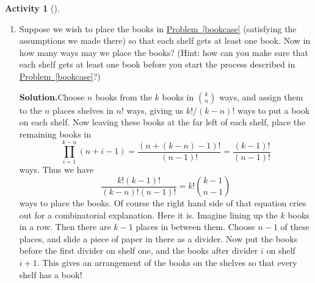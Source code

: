 \documentclass[10pt,]{book}
\theoremstyle{plain}
\theoremstyle{definition}
\newtheorem{activity}[project]{Activity}
\numberwithin{equation}{chapter}
\begin{document}
\begin{activity}[]
\begin{enumerate}[label=(\alph*)]
~\par
\item Suppose we wish to place the books in \hyperref[bookcase]{Problem~\ref{bookcase}} (satisfying the assumptions we made there) so that each shelf gets at least one book. Now in how many ways may we place the books? (Hint: how can you make sure that each shelf gets at least one book before you start the process described in \hyperref[bookcase]{Problem~\ref{bookcase}}?)%
\par\medskip\noindent%
\textbf{Solution.}\quad Choose \(n\) books from the \(k\) books in \(\binom{k}{n}\) ways, and assign them to the \(n\) places shelves in \(n!\) ways, giving us \(k!/(k-n)!\) ways to put a book on each shelf. Now leaving these books at the far left of each shelf, place the remaining books in%
\begin{equation*}
\prod_{i=1}^{k-n}
(n+i-1)=\frac{(n+(k-n)-1)!}{(n-1)!}=\frac{(k-1)!}{(n-1)!}
\end{equation*}
ways. Thus we have%
\begin{equation*}
\frac{k!(k-1)!}{(k-n)!(n-1)!}=k!\binom{k-1}{n-1}
\end{equation*}
ways to place the books. Of course the right hand side of that equation cries out for a combinatorial explanation. Here it is. Imagine lining up the \(k\) books in a row. Then there are \(k-1\) places in between them. Choose \(n-1\) of these places, and slide a piece of paper in there as a divider. Now put the books before the first divider on shelf one, and the books after divider \(i\) on shelf \(i+1\). This gives an arrangement of the books on the shelves so that every shelf has a book!%

\end{enumerate}
\end{activity}
\end{document}

